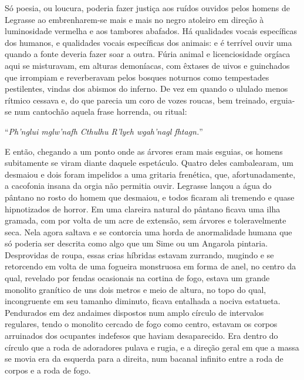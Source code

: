 \begin{pages}
\begin{Rightside}
Só poesia, ou loucura, poderia fazer justiça aos ruídos ouvidos pelos
homens de Legrasse ao embrenharem-se mais e mais no negro atoleiro em
direção à luminosidade vermelha e aos tambores abafados. Há qualidades
vocais específicas dos humanos, e qualidades vocais específicas dos
animais: e é terrível ouvir uma quando a fonte deveria fazer soar a
outra. Fúria animal e licenciosidade orgíaca aqui se misturavam, em
alturas demoníacas, com êxtases de uivos e guinchados que irrompiam e
reverberavam pelos bosques noturnos como tempestades pestilentes, vindas
dos abismos do inferno. De vez em quando o ululado menos rítmico cessava
e, do que parecia um coro de vozes roucas, bem treinado, erguia-se num
cantochão aquela frase horrenda, ou ritual:

``\emph{Ph'nglui mglw'nafh Cthulhu R'lyeh wgah'nagl fhtagn.}''

E então, chegando a um ponto onde as árvores eram mais esguias, os
homens subitamente se viram diante daquele espetáculo. Quatro deles
cambalearam, um desmaiou e dois foram impelidos a uma gritaria
frenética, que, afortunadamente, a cacofonia insana da orgia não
permitia ouvir. Legrasse lançou a água do pântano no rosto do homem que
desmaiou, e todos ficaram ali tremendo e quase hipnotizados de horror.
Em uma clareira natural do pântano ficava uma ilha gramada, com por
volta de um acre de extensão, sem árvores e toleravelmente seca. Nela
agora saltava e se contorcia uma horda de anormalidade humana que só
poderia ser descrita como algo que um Sime ou um Angarola pintaria. Desprovidas de
roupa, essas crias híbridas estavam zurrando, mugindo e se retorcendo em
volta de uma fogueira monstruosa em forma de anel, no centro da qual,
revelado por fendas ocasionais na cortina de fogo, estava um grande
monolito granítico de uns dois metros e meio de altura, no topo do qual,
incongruente em seu tamanho diminuto, ficava entalhada a nociva
estatueta. Pendurados em dez andaimes dispostos num amplo círculo de
intervalos regulares, tendo o monolito cercado de fogo como centro,
estavam os corpos arruinados dos ocupantes indefesos que haviam
desaparecido. Era dentro do círculo que a roda de adoradores pulava e
rugia, e a direção geral em que a massa se movia era da esquerda para a
direita, num bacanal infinito entre a roda de corpos e a roda de fogo.


\end{Rightside}
\end{pages}
